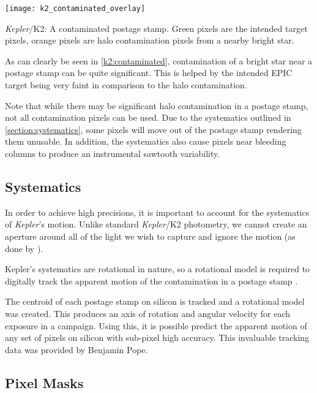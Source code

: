 \documentclass{book}
\begin{document}
\begin{staticfigure}
	\centering
		\texttt{[image: k2\_contaminated\_overlay]}
	\caption{\textit{Kepler}/K2: A contaminated postage stamp. Green pixels are
			 the intended target pixels, orange pixels are halo contamination
			 pixels from a nearby bright star.}
	\label{k2:contaminated}
\end{staticfigure}

As can clearly be seen in \autoref{k2:contaminated}, contamination of a bright
star near a postage stamp can be quite significant. This is helped by the intended
EPIC target being very faint in comparison to the halo contamination.

Note that while there may be significant halo contamination in a postage stamp,
not all contamination pixels can be used. Due to the systematics outlined in
\autoref{section:systematics}, some pixels will move out of the postage stamp
rendering them unusable. In addition, the systematics also cause pixels near
bleeding columns to produce an instrumental sawtooth variability.

\subsection{Systematics}
\label{section:systematics}

In order to achieve high precisions, it is important to account for the systematics
of \textit{Kepler}'s motion. Unlike standard \textit{Kepler}/K2 photometry, we
cannot create an aperture around all of the light we wish to capture and ignore
the motion (as done by \citet{2014PASP..126..948V}).

Kepler's systematics are rotational in nature, so a rotational model is required
to digitally track the apparent motion of the contamination in a postage stamp
\citep{2015MNRAS.447.2880A}.

The centroid of each postage stamp on silicon is tracked \citep[p~1784]{2010AJ....139.1782L}
and a rotational model was created. This produces an axis of rotation and
angular velocity for each exposure in a campaign. Using this, it is possible
predict the apparent motion of any set of pixels on silicon with sub-pixel high
accuracy. This invaluable tracking data was provided by Benjamin Pope.

\subsection{Pixel Masks}
\end{document}
